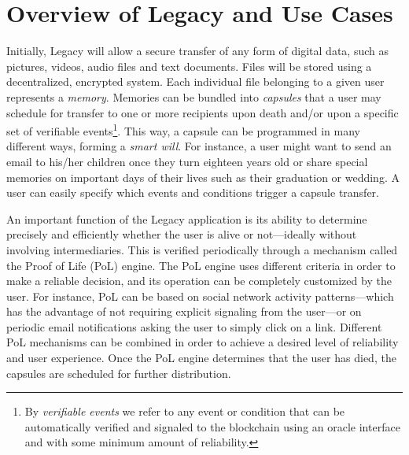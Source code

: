 
\section{Overview of Legacy and Use Cases} %
\label{sec:overview_of_legacy_and_use_cases}

Initially, Legacy will allow a secure transfer of any form of digital data, such as pictures, videos, audio files and text documents. Files will be stored using a decentralized, encrypted system. Each individual file belonging to a given user represents a \textit{memory}. Memories can be bundled into \textit{capsules} that a user may schedule for transfer to one or more recipients upon death and/or upon a specific set of verifiable events\footnote{By \textit{verifiable events} we refer to any event or condition that can be automatically verified and signaled to the blockchain using an oracle interface and with some minimum amount of reliability.}. This way, a capsule can be programmed in many different ways, forming a \textit{smart will}. For instance, a user might want to send an email to his/her children once they turn eighteen years old or share special memories on important days of their lives such as their graduation or wedding. A user can easily specify which events and conditions trigger a capsule transfer.

An important function of the Legacy application is its ability to determine precisely and efficiently whether the user is alive or not---ideally without involving intermediaries. This is verified periodically through a mechanism called the Proof of Life (PoL) engine. The PoL engine uses different criteria in order to make a reliable decision, and its operation can be completely customized by the user. For instance, PoL can be based on social network activity patterns---which has the advantage of not requiring explicit signaling from the user---or on periodic email notifications asking the user to simply click on a link. Different PoL mechanisms can be combined in order to achieve a desired level of reliability and user experience. Once the PoL engine determines that the user has died, the capsules are scheduled for further distribution.


